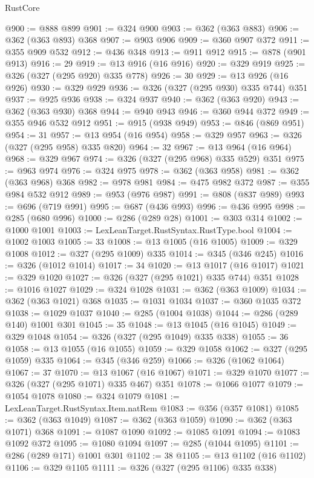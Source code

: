 \begin{lexlean}{RustCore}
\begin{coremodule}
@900 := @888 @899
@901 := @324 @900
@903 := @362 (@363 @883)
@906 := @362 (@363 @893) @368
@907 := @903 @906
@909 := @360 @907 @372
@911 := @355 @909 @532
@912 := @436 @348
@913 := @911 @912
@915 := @878 (@901 @913)
@916 := 29
@919 := @13 @916 (@16 @916)
@920 := @329 @919
@925 := @326 (@327 (@295 @920) @335 @778)
@926 := 30
@929 := @13 @926 (@16 @926)
@930 := @329 @929
@936 := @326 (@327 (@295 @930) @335 @744) @351
@937 := @925 @936
@938 := @324 @937
@940 := @362 (@363 @920)
@943 := @362 (@363 @930) @368
@944 := @940 @943
@946 := @360 @944 @372
@949 := @355 @946 @532 @912
@951 := @915 (@938 @949)
@953 := @846 (@869 @951)
@954 := 31
@957 := @13 @954 (@16 @954)
@958 := @329 @957
@963 := @326 (@327 (@295 @958) @335 @820)
@964 := 32
@967 := @13 @964 (@16 @964)
@968 := @329 @967
@974 := @326 (@327 (@295 @968) @335 @529) @351
@975 := @963 @974
@976 := @324 @975
@978 := @362 (@363 @958)
@981 := @362 (@363 @968) @368
@982 := @978 @981
@984 := @475 @982 @372
@987 := @355 @984 @532 @912
@989 := @953 (@976 @987)
@991 := @808 (@837 @989)
@993 := @696 (@719 @991)
@995 := @687 (@436 @993)
@996 := @436 @995
@998 := @285 (@680 @996)
@1000 := @286 (@289 @28)
@1001 := @303 @314
@1002 := @1000 @1001
@1003 := LexLeanTarget.RustSyntax.RustType.bool
@1004 := @1002 @1003
@1005 := 33
@1008 := @13 @1005 (@16 @1005)
@1009 := @329 @1008
@1012 := @327 (@295 @1009) @335
@1014 := @345 (@346 @245)
@1016 := @326 (@1012 @1014)
@1017 := 34
@1020 := @13 @1017 (@16 @1017)
@1021 := @329 @1020
@1027 := @326 (@327 (@295 @1021) @335 @744) @351
@1028 := @1016 @1027
@1029 := @324 @1028
@1031 := @362 (@363 @1009)
@1034 := @362 (@363 @1021) @368
@1035 := @1031 @1034
@1037 := @360 @1035 @372
@1038 := @1029 @1037
@1040 := @285 (@1004 @1038)
@1044 := @286 (@289 @140) @1001 @301
@1045 := 35
@1048 := @13 @1045 (@16 @1045)
@1049 := @329 @1048
@1054 := @326 (@327 (@295 @1049) @335 @338)
@1055 := 36
@1058 := @13 @1055 (@16 @1055)
@1059 := @329 @1058
@1062 := @327 (@295 @1059) @335
@1064 := @345 (@346 @259)
@1066 := @326 (@1062 @1064)
@1067 := 37
@1070 := @13 @1067 (@16 @1067)
@1071 := @329 @1070
@1077 := @326 (@327 (@295 @1071) @335 @467) @351
@1078 := @1066 @1077
@1079 := @1054 @1078
@1080 := @324 @1079
@1081 := LexLeanTarget.RustSyntax.Item.natRem
@1083 := @356 (@357 @1081)
@1085 := @362 (@363 @1049)
@1087 := @362 (@363 @1059)
@1090 := @362 (@363 @1071) @368
@1091 := @1087 @1090
@1092 := @1085 @1091
@1094 := @1083 @1092 @372
@1095 := @1080 @1094
@1097 := @285 (@1044 @1095)
@1101 := @286 (@289 @171) @1001 @301
@1102 := 38
@1105 := @13 @1102 (@16 @1102)
@1106 := @329 @1105
@1111 := @326 (@327 (@295 @1106) @335 @338)

\end{coremodule}
\end{lexlean}

